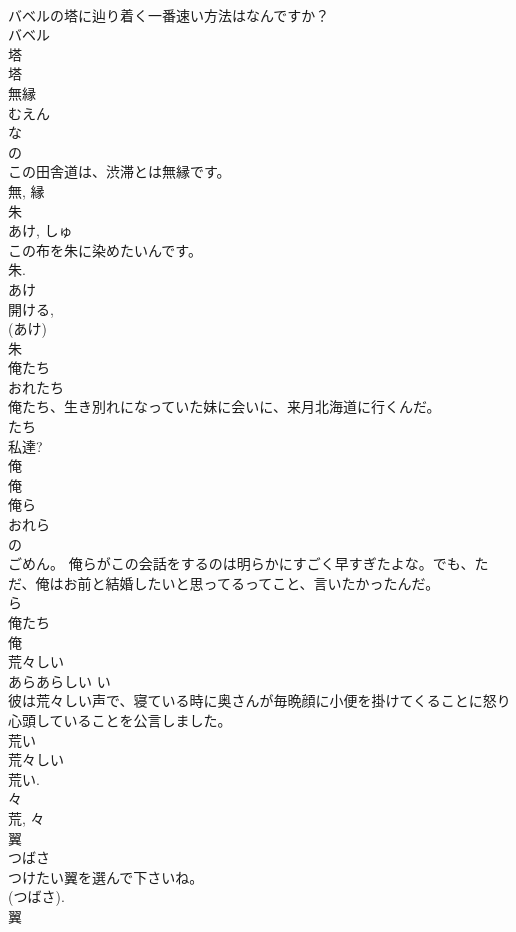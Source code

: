 \documentclass[8pt]{extreport}
\begin{document}
\begin{CJK}{UTF8}{min}
\\	バベルの塔に辿り着く一番速い方法はなんですか？	
\\	バベル
\\	塔 
\\	塔	
\\	無縁	
\\	むえん	
\\	な 
\\	の 
\\	この田舎道は、渋滞とは無縁です。	
\\	無, 縁	
\\	朱	
\\	あけ, しゅ	
\\	この布を朱に染めたいんです。	
\\	朱.	
\\	あけ 
\\	開ける, 
\\	(あけ) 
\\	朱	
\\	俺たち	
\\	おれたち	
\\	俺たち、生き別れになっていた妹に会いに、来月北海道に行くんだ。	
\\	たち 
\\	私達? 
\\	俺 
\\	俺	
\\	俺ら	
\\	おれら	
\\	の 
\\	ごめん。 俺らがこの会話をするのは明らかにすごく早すぎたよな。でも、ただ、俺はお前と結婚したいと思ってるってこと、言いたかったんだ。	
\\	ら 
\\	俺たち 
\\	俺	
\\	荒々しい	
\\	あらあらしい	い 
\\	彼は荒々しい声で、寝ている時に奥さんが毎晩顔に小便を掛けてくることに怒り心頭していることを公言しました。	
\\	荒い 
\\	荒々しい 
\\	荒い. 
\\	々 
\\	荒, 々	
\\	翼	
\\	つばさ	
\\	つけたい翼を選んで下さいね。	
\\	(つばさ). 
\\	翼	

\end{CJK}
\end{document}
